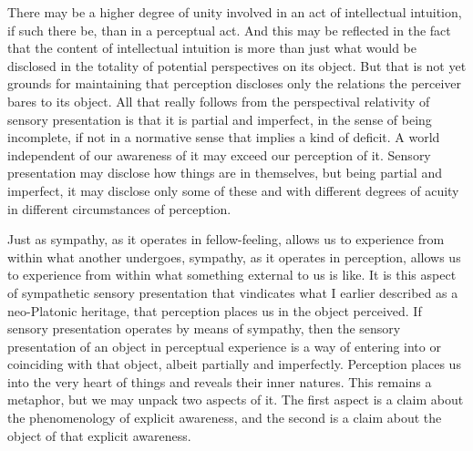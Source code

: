 There may be a higher degree of unity involved in an act of intellectual intuition, if such there be, than in a perceptual act. And this may be reflected in the fact that the content of intellectual intuition is more than just what would be disclosed in the totality of potential perspectives on its object. But that is not yet grounds for maintaining that perception discloses only the relations the perceiver bares to its object. All that really follows from the perspectival relativity of sensory presentation is that it is partial and imperfect, in the sense of being incomplete, if not in a normative sense that implies a kind of deficit. A world independent of our awareness of it may exceed our perception of it. Sensory presentation may disclose how things are in themselves, but being partial and imperfect, it may disclose only some of these and with different degrees of acuity in different circumstances of perception.

Just as sympathy, as it operates in fellow-feeling, allows us to experience from within what another undergoes, sympathy, as it operates in perception, allows us to experience from within what something external to us is like. It is this aspect of sympathetic sensory presentation that vindicates what I earlier described as a neo-Platonic heritage, that perception places us in the object perceived. If sensory presentation operates by means of sympathy, then the sensory presentation of an object in perceptual experience is a way of entering into or coinciding with that object, albeit partially and imperfectly. Perception places us into the very heart of things and reveals their inner natures. This remains a metaphor, but we may unpack two aspects of it. The first aspect is a claim about the phenomenology of explicit awareness, and the second is a claim about the object of that explicit awareness.

